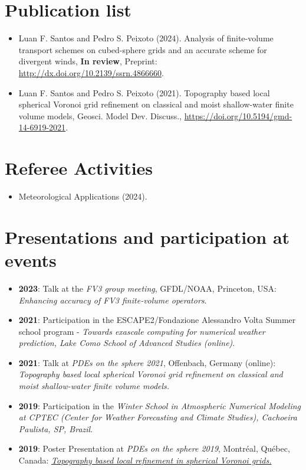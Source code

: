 \documentclass[letterpaper,11pt]{article}
\begin{document}
\section{Publication list}
\begin{itemize}
	\item Luan F. Santos and Pedro S. Peixoto (2024).
	{ Analysis of finite-volume transport schemes on cubed-sphere grids and an accurate scheme for divergent winds}, 
	{\bf In review}, Preprint: \href{http://dx.doi.org/10.2139/ssrn.4866660}{http://dx.doi.org/10.2139/ssrn.4866660}.
	\item Luan F. Santos and Pedro S. Peixoto (2021).
	{Topography based local spherical Voronoi grid refinement on classical and moist shallow-water finite volume models}, Geosci. Model Dev. Discuss., \href{https://doi.org/10.5194/gmd-14-6919-2021
	}{https://doi.org/10.5194/gmd-14-6919-2021}.
\end{itemize}

\section{Referee Activities}
\begin{itemize}
\item Meteorological Applications (2024).
\end{itemize}


\section{Presentations and participation at events}
\begin{itemize}
	\item \textbf{2023}: Talk at the \textit{FV3 group meeting}, 
	GFDL/NOAA, Princeton, USA: \textit{Enhancing accuracy of FV3 finite-volume operators}.
	\item \textbf{2021}: Participation in the
    ESCAPE2/Fondazione Alessandro Volta  Summer school program -
    \textit{Towards exascale computing
	for numerical weather prediction, Lake Como School of Advanced Studies (online)}.
	\item \textbf{2021}: Talk at \textit{PDEs on the sphere 2021}, Offenbach, Germany (online): \textit{Topography based local spherical Voronoi grid refinement on classical and moist shallow-water finite volume models.} 
	\item \textbf{2019}: Participation in the \textit{Winter School in Atmospheric Numerical Modeling at CPTEC (Center for Weather Forecasting and Climate Studies), Cachoeira Paulista, SP, Brazil}.
	\item \textbf{2019}: Poster Presentation at \textit{PDEs on the sphere 2019}, Montréal, Québec, Canada:
	\textit{\href{https://collaboration.cmc.ec.gc.ca/science/pdes-2019/pdfs/poster-Luan-Santos.pdf}{Topography based local refinement in spherical Voronoi grids.}}
\end{itemize}
\end{document}
